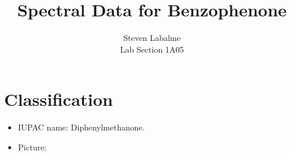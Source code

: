 \documentclass[titlepage]{article}
\title{Spectral Data for Benzophenone}
\author{
    Steven Labalme\\
    \normalsize Lab Section 1A05
}
\begin{document}
\maketitle



\pagestyle{main}
\renewcommand{\leftmark}{Lab Assignment 1c}
\section*{Classification}
\begin{itemize}
    \item IUPAC name: Diphenylmethanone.
    \item Picture:
    \begin{center}
    \end{center}
\end{itemize}



\end{document}
